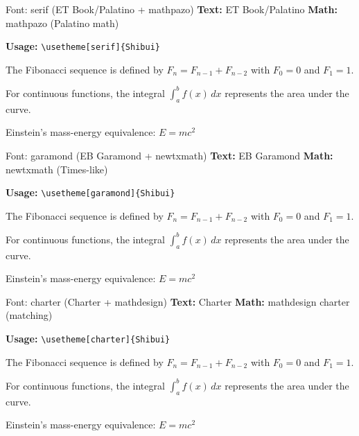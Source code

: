 \documentclass[aspectratio=169]{beamer}
\begin{document}
\begin{frame}{Font: serif (ET Book/Palatino + mathpazo)}
  \textbf{Text:} ET Book/Palatino \quad \textbf{Math:} mathpazo (Palatino math)

  \vspace{0.5em}

  \textbf{Usage:} \texttt{\textbackslash usetheme[serif]\{Shibui\}}

  \vspace{1em}

  {\selectfont
  The Fibonacci sequence is defined by $F_n = F_{n-1} + F_{n-2}$ with $F_0 = 0$ and $F_1 = 1$.

  For continuous functions, the integral $\int_a^b f(x)\,dx$ represents the area under the curve.

  Einstein's mass-energy equivalence: $E = mc^2$}
\end{frame}

\begin{frame}{Font: garamond (EB Garamond + newtxmath)}
  \textbf{Text:} EB Garamond \quad \textbf{Math:} newtxmath (Times-like)

  \vspace{0.5em}

  \textbf{Usage:} \texttt{\textbackslash usetheme[garamond]\{Shibui\}}

  \vspace{1em}

  {\selectfont
  The Fibonacci sequence is defined by $F_n = F_{n-1} + F_{n-2}$ with $F_0 = 0$ and $F_1 = 1$.

  For continuous functions, the integral $\int_a^b f(x)\,dx$ represents the area under the curve.

  Einstein's mass-energy equivalence: $E = mc^2$}
\end{frame}

\begin{frame}{Font: charter (Charter + mathdesign)}
  \textbf{Text:} Charter \quad \textbf{Math:} mathdesign charter (matching)

  \vspace{0.5em}

  \textbf{Usage:} \texttt{\textbackslash usetheme[charter]\{Shibui\}}

  \vspace{1em}

  {\selectfont
  The Fibonacci sequence is defined by $F_n = F_{n-1} + F_{n-2}$ with $F_0 = 0$ and $F_1 = 1$.

  For continuous functions, the integral $\int_a^b f(x)\,dx$ represents the area under the curve.

  Einstein's mass-energy equivalence: $E = mc^2$}
\end{frame}
\end{document}
